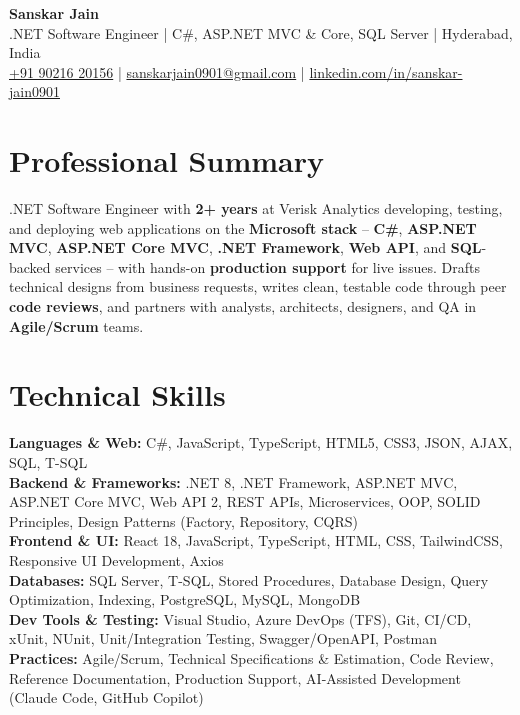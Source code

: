 \documentclass[a4paper,10pt]{article}
\begin{document}
\begin{center}
    {\LARGE \textbf{Sanskar Jain}} \\
    \vspace{2pt}
    .NET Software Engineer \;|\; C\#, ASP.NET MVC \& Core, SQL Server \;|\; Hyderabad, India \\
    \href{tel:+919021620156}{+91 90216 20156} \;|\;
    \href{mailto:sanskarjain0901@gmail.com}{sanskarjain0901@gmail.com} \;|\;
    \href{https://www.linkedin.com/in/sanskar-jain0901/}{linkedin.com/in/sanskar-jain0901}
\end{center}

\section*{Professional Summary}
.NET Software Engineer with \textbf{2+ years} at Verisk Analytics developing, testing, and deploying web applications on the \textbf{Microsoft stack} -- \textbf{C\#}, \textbf{ASP.NET MVC}, \textbf{ASP.NET Core MVC}, \textbf{.NET Framework}, \textbf{Web API}, and \textbf{SQL}-backed services -- with hands-on \textbf{production support} for live issues.
Drafts technical designs from business requests, writes clean, testable code through peer \textbf{code reviews}, and partners with analysts, architects, designers, and QA in \textbf{Agile/Scrum} teams.

\section*{Technical Skills}
\begin{sloppypar}
\noindent
\textbf{Languages \& Web:} C\#, JavaScript, TypeScript, HTML5, CSS3, JSON, AJAX, SQL, T-SQL \\
\textbf{Backend \& Frameworks:} .NET 8, .NET Framework, ASP.NET MVC, ASP.NET Core MVC, Web API 2, REST APIs, Microservices, OOP, SOLID Principles, Design Patterns (Factory, Repository, CQRS) \\
\textbf{Frontend \& UI:} React 18, JavaScript, TypeScript, HTML, CSS, TailwindCSS, Responsive UI Development, Axios \\
\textbf{Databases:} SQL Server, T-SQL, Stored Procedures, Database Design, Query Optimization, Indexing, PostgreSQL, MySQL, MongoDB \\
\textbf{Dev Tools \& Testing:} Visual Studio, Azure DevOps (TFS), Git, CI/CD, xUnit, NUnit, Unit/Integration Testing, Swagger/OpenAPI, Postman \\
\textbf{Practices:} Agile/Scrum, Technical Specifications \& Estimation, Code Review, Reference Documentation, Production Support, AI-Assisted Development (Claude Code, GitHub Copilot)
\end{sloppypar}
\end{document}

